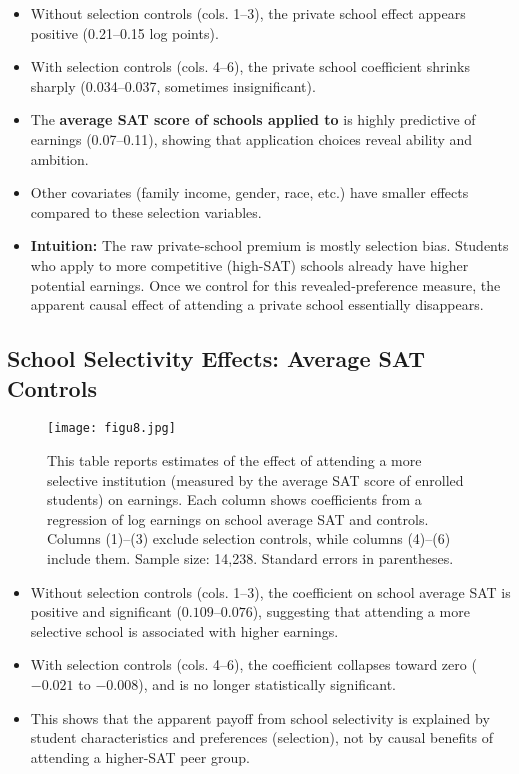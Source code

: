 \documentclass[12pt]{article}
\begin{document}
\begin{itemize}
    \item Without selection controls (cols. 1–3), the private school effect appears positive (0.21–0.15 log points).  
    \item With selection controls (cols. 4–6), the private school coefficient shrinks sharply (0.034–0.037, sometimes insignificant).  
    \item The \textbf{average SAT score of schools applied to} is highly predictive of earnings (0.07–0.11), showing that application choices reveal ability and ambition.  
    \item Other covariates (family income, gender, race, etc.) have smaller effects compared to these selection variables.  
\end{itemize}

\begin{itemize}
    \item \textbf{Intuition:} The raw private-school premium is mostly selection bias. Students who apply to more competitive (high-SAT) schools already have higher potential earnings. Once we control for this revealed-preference measure, the apparent causal effect of attending a private school essentially disappears.
\end{itemize}

\subsection*{\noindent\textbf{School Selectivity Effects: Average SAT Controls}}

\begin{figure}[H]
    \centering
    \texttt{[image: figu8.jpg]} %
    \caption*{This table reports estimates of the effect of attending a more selective institution 
    (measured by the average SAT score of enrolled students) on earnings. Each column shows coefficients 
    from a regression of log earnings on school average SAT and controls. Columns (1)--(3) exclude 
    selection controls, while columns (4)--(6) include them. Sample size: 14,238. Standard errors in parentheses.}
\end{figure}

\begin{itemize}
    \item Without selection controls (cols. 1–3), the coefficient on school average SAT is positive and significant ($0.109$–$0.076$), suggesting that attending a more selective school is associated with higher earnings.  
    \item With selection controls (cols. 4–6), the coefficient collapses toward zero ($-0.021$ to $-0.008$), and is no longer statistically significant.  
    \item This shows that the apparent payoff from school selectivity is explained by student characteristics and preferences (selection), not by causal benefits of attending a higher-SAT peer group.  
\end{itemize}
\end{document}
